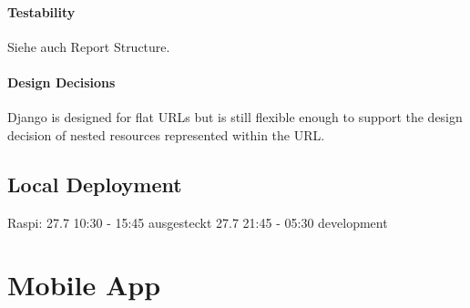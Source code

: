 \paragraph{Testability}



Siehe auch Report Structure.


\paragraph{Design Decisions}

Django is designed for flat URLs but is still flexible enough to support the design decision of nested resources represented within the URL.


\subsection{Local Deployment}

Raspi: 27.7 10:30 - 15:45 ausgesteckt
27.7 21:45 - 05:30 development


\section{Mobile App}
